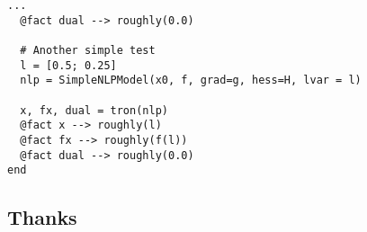 \begin{frame}[t,fragile]
\begin{lstlisting}[basicstyle=\scriptsize\tt]
  ...
  @fact dual --> roughly(0.0)

  # Another simple test
  l = [0.5; 0.25]
  nlp = SimpleNLPModel(x0, f, grad=g, hess=H, lvar = l)

  x, fx, dual = tron(nlp)
  @fact x --> roughly(l)
  @fact fx --> roughly(f(l))
  @fact dual --> roughly(0.0)
end
\end{lstlisting}
\end{frame}

\subsection{Thanks}
